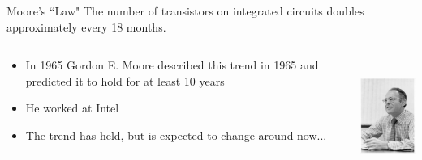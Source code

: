 \documentclass[xcolor=x11names,compress]{beamer}
\renewcommand{\(}{\begin{columns}}
\renewcommand{\)}{\end{columns}}
\newcommand{\<}[1]{\begin{column}{#1}}
\renewcommand{\>}{\end{column}}
\begin{document}

\begin{frame}{Moore's ``Law"}
The number of transistors on integrated circuits doubles approximately every 18 months. 

\begin{columns}
  \begin{column}{0.7\textwidth}
\begin{itemize}
\item In 1965 Gordon E. Moore described this trend in 1965 and predicted it to hold for at least 10 years
\item He worked at Intel
\item The trend has held, but is expected to change around now...
\end{itemize}
  \end{column}
  \begin{column}{0.3\textwidth}
    \includegraphics[height=1.5in,clip]{GordonMoore1975}
  \end{column}
\end{columns}
\end{frame}
\end{document}
